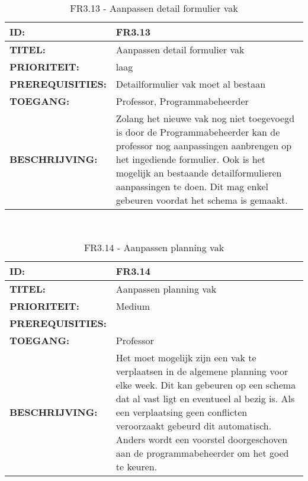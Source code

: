\noindent\begin{table}[H]
            \begin{tabular}{l | p{10cm}}
                \textbf{ID:} & FR3.13 \\ \hline
                \textbf{TITEL:} & Aanpassen detail formulier vak \\ \hline
                \textbf{PRIORITEIT:} &  laag \\ \hline
                \textbf{PREREQUISITIES:} & Detailformulier vak moet al bestaan\\ \hline
                \textbf{TOEGANG:} & Professor, Programmabeheerder \\ \hline
                \textbf{BESCHRIJVING:} & Zolang het nieuwe vak nog niet toegevoegd is door de Programmabeheerder kan de professor nog aanpassingen aanbrengen op het ingediende formulier. Ook is het mogelijk an bestaande detailformulieren aanpassingen te doen. Dit mag enkel gebeuren voordat het schema is gemaakt.\\ 
            \end{tabular}\\
            \caption{FR3.13 - Aanpassen detail formulier vak}
            \label{tab:FR3.13 - Aanpassen detail formulier vak}
        \end{table}

\noindent\begin{table}[H]
            \begin{tabular}{l | p{10cm}}
                \textbf{ID:} & FR3.14 \\ \hline
                \textbf{TITEL:} & Aanpassen planning vak\\ \hline
                \textbf{PRIORITEIT:} &  Medium \\ \hline
                \textbf{PREREQUISITIES:} & \\ \hline
                \textbf{TOEGANG:} & Professor \\ \hline
                \textbf{BESCHRIJVING:} & Het moet mogelijk  zijn een vak te verplaatsen in de algemene planning voor elke week. Dit kan gebeuren op een schema dat al vast ligt en eventueel al bezig is. Als een verplaatsing geen conflicten veroorzaakt gebeurd dit automatisch. Anders wordt een voorstel doorgeschoven aan de programmabeheerder om het goed te keuren.\\
            \end{tabular}\\
            \caption{FR3.14 - Aanpassen planning vak}
            \label{tab:FR3.14 - Aanpassen planning vak}
        \end{table}
        

